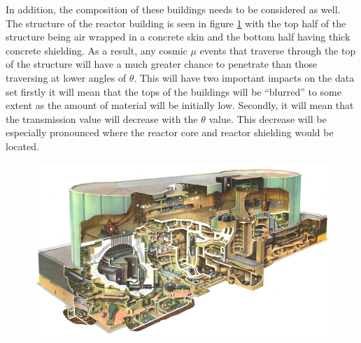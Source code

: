 

In addition, the composition of these buildings needs to be considered as well. The structure of the reactor building is seen in figure \ref{fig:wylfaReactorRoughStructure} with the top half of the structure being air wrapped in a concrete skin and the bottom half having thick concrete shielding. As a result, any cosmic $\mu$ events that traverse through the top of the structure will have a much greater chance to penetrate than those traversing at lower angles of $\theta$. This will have two important impacts on the data set firstly it will mean that the tops of the buildings will be ``blurred'' to some extent as the amount of material will be initially low. Secondly, it will mean that the transmission value will decrease with the $\theta$ value. This decrease will be especially pronounced where the reactor core and reactor shielding would be located. 

\begin{figure}[!h]
 \centering
 \includegraphics[width=0.7\linewidth]{Chapter5/Figs/wylfaRasterNew/wylfaReactorRoughStructure.png}
 \label{fig:wylfaReactorRoughStructure}
\end{figure}

